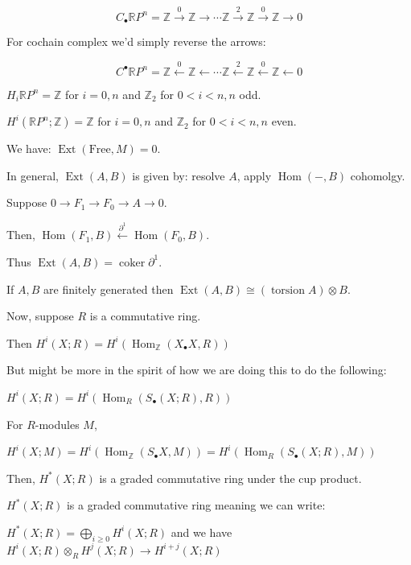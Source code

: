 \documentclass{article}
\theoremstyle{definition}
\begin{document}
    \[
        C_\bullet \mathbb{R} P^n = \mathbb{Z} \xrightarrow{0} \mathbb{Z} \to \cdots \mathbb{Z} \xrightarrow{2} \mathbb{Z} \xrightarrow{0} \mathbb{Z} \to 0
    \]

    For cochain complex we'd simply reverse the arrows:

    \[
        C^\bullet \mathbb{R} P^n = \mathbb{Z} \xleftarrow{0} \mathbb{Z} \leftarrow \cdots \mathbb{Z} \xleftarrow{2} \mathbb{Z} \xleftarrow{0} \mathbb{Z} \leftarrow 0
    \]

    \(H_i \mathbb{R}P^n = \mathbb{Z}\) for \(i=0,n\) and \(\mathbb{Z}_2\) for \(0 < i < n, n\) odd.

    \(H^i (\mathbb{R} P^n; \mathbb{Z} ) = \mathbb{Z}\) for \(i = 0,n\) and \(\mathbb{Z}_2\) for \(0 < i < n, n\) even.
    
    We have: \(\operatorname{Ext}(\text{Free}, M) = 0\).
    
    In general, \(\operatorname{Ext}(A,B)\) is given by: resolve \(A\), apply \(\operatorname{Hom}(-,B)\) cohomolgy.

    Suppose \(0 \to F_1 \to F_0 \to A \to 0\).

    Then, \(\operatorname{Hom}(F_1, B) \xleftarrow{\partial^1} \operatorname{Hom}(F_0, B)\).

    Thus \(\operatorname{Ext}(A,B) = \operatorname{coker} \partial^1\).

    If \(A, B\) are finitely generated then \(\operatorname{Ext}(A,B) \cong (\operatorname{torsion} A) \otimes B\).

    Now, suppose \(R\) is a commutative ring.

    Then \(H^i(X;R) = H^i(\operatorname{Hom}_\mathbb{Z}(X_\bullet X, R))\)
    
    But might be more in the spirit of how we are doing this to do the following:

    \(H^i(X;R) = H^i(\operatorname{Hom}_R(S_\bullet(X;R),R))\)
    
    For \(R\)-modules \(M\),

    \(H^i(X;M) = H^i(\operatorname{Hom}_\mathbb{Z}(S_\bullet X, M)) = H^i(\operatorname{Hom}_R(S_\bullet(X;R),M))\)
    
    Then, \(H^{\ast} (X;R)\) is a graded commutative ring under the cup product.

    \(H^{\ast} (X;R)\) is a graded commutative ring meaning we can write:
    
    \(H^{\ast} (X;R) = \bigoplus_{i \geq 0} H^i(X;R)\) and we have \(H^i(X;R) \otimes_R H^j(X;R) \to H^{i+j} (X;R)\)
\end{document}
